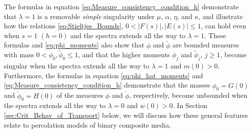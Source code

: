 \documentclass[english,12pt,jmp,graphicx]{revtex4-1}
\newcommand{\ph}{\hat{\phi}}
\begin{document}
The formulas in equation \eqref{eq:Measure_consistency_condition_h}
demonstrate that $\lambda=1$ is a removable \emph{simple} singularity under
$\mu$, $\alpha$, $\eta$, and $\kappa$, and illustrate how the relations
\eqref{eq:Stieltjes_Bounds}, $0<|F(s)|,|E(s)|\leq1$, can hold even when 
$s=1$ $(h=0)$ and the spectra extends all the way to $\lambda=1$. These
formulas and \eqref{eq:phi_moments} also show that $\phi$ and $\tilde{\phi}$
are bounded measures with mass $0<\phi_0,\tilde{\phi}_0\leq1$, and that the
higher moments $\phi_j$ and $\tilde{\phi}_j$, $j\geq1$, become singular when
the spectra extends all the way to $\lambda=1$ and $m(0)>0$. Furthermore,
the formulas in equation \eqref{eq:phi_hat_moments}
and \eqref{eq:Measure_consistency_condition_h} demonstrate that the masses
$\ph_0=G(0)$ and $\check{\phi}_0=H(0)$ of the measures $\ph$ and
$\check{\phi}$, respectively, become unbounded when the spectra extends all the way to
$\lambda=0$ and $w(0)>0$. In Section \ref{sec:Crit_Behav_of_Transport} below, we
will discuss how these general features relate to percolation models
of binary composite media.        
%
\end{document}
